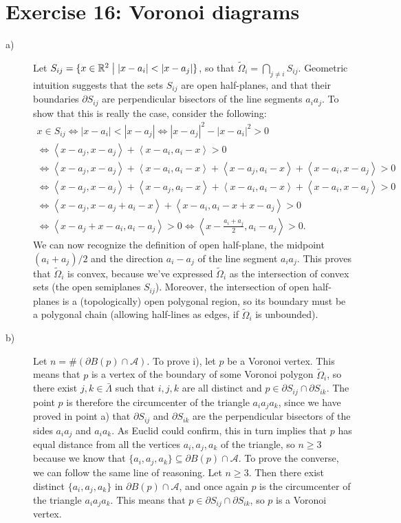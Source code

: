 \documentclass[a4paper]{article}
\newcommand{\abs}[1]{\left\lvert #1 \right\rvert}
\newcommand{\dpair}[1]{\left\langle #1 \right\rangle}
\newcommand{\R}{\mathbb{R}}
\begin{document}
\section*{Exercise 16: Voronoi diagrams}
\begin{description}
\item[a)] Let $S_{ij} = \{x \in \R^2 \bigm| \abs{x-a_i} < \abs{x-a_j}\}$,
	so that $\tilde{\Omega}_i = \bigcap_{j \neq i} S_{ij}$.
	Geometric intuition suggests that the sets $S_{ij}$ are open half-planes,
	and that their boundaries $\partial S_{ij}$ are perpendicular bisectors
	of the line segments $a_i a_j$.
	To show that this is really the case, consider the following:
	\begin{gather*}
	x \in S_{ij}
	\iff \abs{x-a_i} < \abs{x-a_j}
	\iff \abs{x-a_j}^2 - \abs{x-a_i}^2 > 0 \\
	\iff \dpair{x-a_j,x-a_j} + \dpair{x-a_i,a_i-x} > 0 \\
	\iff \dpair{x-a_j,x-a_j} + \dpair{x-a_i,a_i-x}
	   + \dpair{x-a_j,a_i-x} + \dpair{x-a_i,x-a_j} > 0 \\
	\iff \dpair{x-a_j,x-a_j} + \dpair{x-a_j,a_i-x}
	   + \dpair{x-a_i,a_i-x} + \dpair{x-a_i,x-a_j} > 0 \\
	\iff \dpair{x-a_j,x-a_j+a_i-x} + \dpair{x-a_i,a_i-x+x-a_j} > 0 \\
	\iff \dpair{x-a_j+x-a_i,a_i-a_j} > 0
	\iff \dpair{x-\frac{a_i+a_j}{2},a_i-a_j} > 0.
	\end{gather*}
	We can now recognize the definition of open half-plane, the midpoint
	$(a_i+a_j)/2$ and the direction $a_i-a_j$ of the line segment $a_i a_j$.
	This proves that $\tilde{\Omega}_i$ is convex, because we've expressed
	$\tilde{\Omega}_i$ as the intersection of convex sets
	(the open semiplanes $S_{ij}$).
	Moreover, the intersection of open half-planes is a (topologically)
	open polygonal region, so its boundary must be a polygonal chain
	(allowing half-lines as edges, if $\tilde{\Omega}_i$ is unbounded).
\item[b)] Let $n = \#(\partial B(p) \cap \mathcal{A})$. To prove i),
	let $p$ be a Voronoi vertex. This means that $p$ is a vertex of
	the boundary of some Voronoi polygon $\tilde{\Omega}_i$, so
	there exist $j,k \in \bar{\Lambda}$ such that $i,j,k$ are all distinct
	and $p \in \partial S_{ij} \cap \partial S_{ik}$.
	The point $p$ is therefore the circumcenter of the triangle $a_i a_j a_k$,
	since we have proved in point a) that $\partial S_{ij}$ and $\partial S_{ik}$
	are the perpendicular bisectors of the sides $a_i a_j$ and $a_i a_k$.
	As Euclid could confirm, this in turn implies that $p$ has equal
	distance from all the vertices $a_i, a_j, a_k$ of the triangle, so $n \geq 3$
	because we know that $\{a_i,a_j,a_k\} \subseteq \partial B(p) \cap \mathcal{A}$.
	To prove the converse, we can follow the same line of reasoning.
	Let $n \geq 3$. Then there exist distinct
	$\{a_i,a_j,a_k\}$ in $\partial B(p) \cap \mathcal{A}$, and once again
	$p$ is the circumcenter of the triangle $a_i a_j a_k$.
	This means that $p \in \partial S_{ij} \cap \partial S_{ik}$,
	so $p$ is a Voronoi vertex.
	

\end{description}
\end{document}
